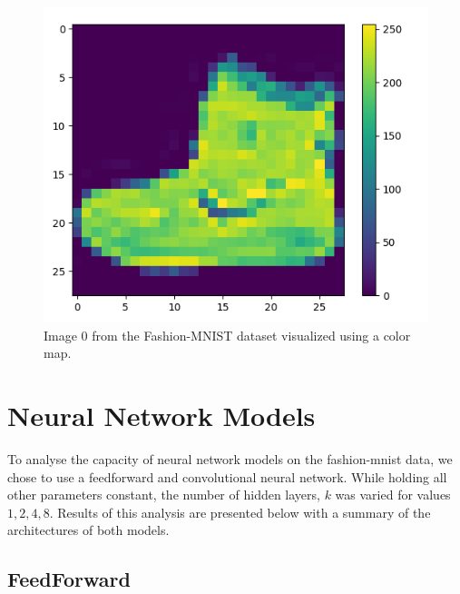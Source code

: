 \documentclass[titlepage]{article}
\begin{document}
\begin{figure}[h!]
\centering
  \includegraphics[scale=.33]{single_image.png}
  \caption{Image 0 from the Fashion-MNIST dataset visualized using a color map.}
  \label{fig:single_image}
\end{figure}


\section{Neural Network Models}
\par To analyse the capacity of neural network models on the fashion-mnist data, we chose to use a feedforward and convolutional neural network. While holding all other parameters constant, the number of hidden layers, $k$ was varied for values ${1,2,4,8}$. Results of this analysis are presented below with a summary of the architectures of both models.

\subsection{FeedForward }
\end{document}
